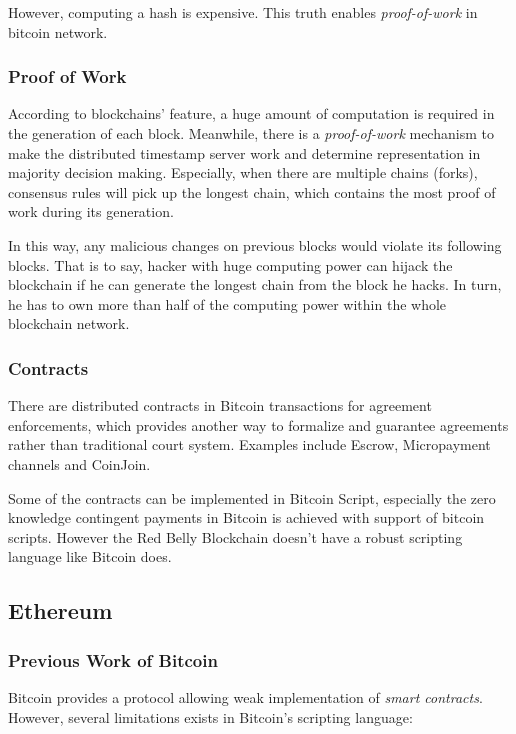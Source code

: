 \documentclass[12pt]{article}
\begin{document}
However, computing a hash is expensive. This truth enables \textit{proof-of-work} in bitcoin network. 

\subsubsection{Proof of Work}

According to blockchains' feature, a huge amount of computation is required in the generation of each block. Meanwhile, there is a \textit{proof-of-work} mechanism to make the distributed timestamp server work and determine representation in majority decision making. Especially, when there are multiple chains (forks), consensus rules will pick up the longest chain, which contains the most proof of work during its generation\cite{nakamoto2008bitcoin}.

In this way, any malicious changes on previous blocks would violate its following blocks. That is to say, hacker with huge computing power can hijack the blockchain if he can generate the longest chain from the block he hacks. In turn, he has to own more than half of the computing power within the whole blockchain network\cite{NG17}.

\subsubsection{Contracts}

There are distributed contracts in Bitcoin transactions for agreement enforcements, which provides another way to formalize and guarantee agreements rather than traditional court system. Examples include Escrow, Micropayment channels and CoinJoin.

Some of the contracts can be implemented in Bitcoin Script, especially the zero knowledge contingent payments in Bitcoin is achieved with support of bitcoin scripts. However the Red Belly Blockchain doesn't have a robust scripting language like Bitcoin does.

\subsection{Ethereum}

\subsubsection{Previous Work of Bitcoin}

Bitcoin provides a protocol allowing weak implementation of \textit{smart contracts}. However, several limitations exists in Bitcoin's scripting language:
\end{document}

